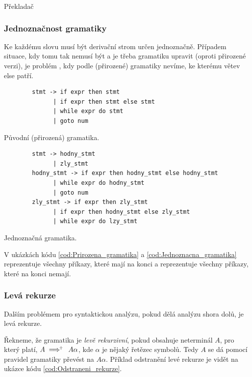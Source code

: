 \begin{definiceN}{Překladač}
\subsubsection{Jednoznačnost gramatiky}

Ke každému slovu musí být derivační strom určen jednoznačně. Případem situace, kdy tomu tak nemusí být a je třeba gramatiku upravit (oproti přirozené verzi), je problém , kdy podle (přirozené) gramatiky nevíme, ke kterému  větev else patří.

\begin{kod}[h]
	\begin{verbatim}
		stmt -> if expr then stmt
		      | if expr then stmt else stmt
		      | while expr do stmt
		      | goto num
	\end{verbatim}
	\caption{Původní (přirozená) gramatika.}
	\label{cod:Prirozena_gramatika}
\end{kod}

\begin{kod}[h]
	\begin{verbatim}
		stmt -> hodny_stmt
		      | zly_stmt
		hodny_stmt -> if expr then hodny_stmt else hodny_stmt
		      | while expr do hodny_stmt
		      | goto num
		zly_stmt -> if expr then zly_stmt
		      | if expr then hodny_stmt else zly_stmt
		      | while expr do lzy_stmt
	\end{verbatim}
	\caption{Jednoznačná gramatika.}
	\label{cod:Jednoznacna_gramatika}
\end{kod}

V ukázkách kódu \ref{cod:Prirozena_gramatika} a \ref{cod:Jednoznacna_gramatika}  reprezentuje všechny příkazy, které mají na konci  a  reprezentuje všechny příkazy, které na konci  nemají.


\subsubsection{Levá rekurze}

Dalším problémem pro syntaktickou analýzu, pokud dělá analýzu shora dolů, je levá rekurze.

\begin{definice}
	Řekneme, že gramatika je \emph{levě rekurzivní}, pokud obsahuje neterminál \(A\), pro který platí, \(A \implies \hskip -0.7em ^+ \hskip 0.7em A \alpha\), kde \(\alpha\) je nějaký řetězec symbolů. Tedy \(A\) se dá pomocí pravidel gramatiky převést na \(A\alpha\). Příklad odstranění levé rekurze je vidět na ukázce kódu \ref{cod:Odstraneni_rekurze}.
\end{definice}


\end{definiceN}
